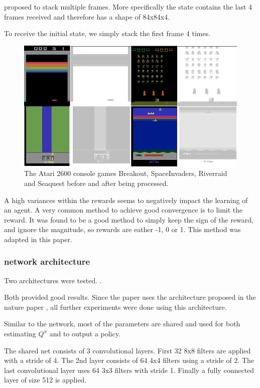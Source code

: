 \citet{nature} proposed to stack multiple frames. More specifically the state contains the last 4 frames received and therefore has a shape of 84x84x4.

To receive the initial state, we simply stack the first frame 4 times.

\begin{figure}
\includegraphics[scale=0.5]{bilder/atarienv.png}
\caption{The Atari 2600 console games Breakout, SpaceInvaders, Riverraid and Seaquest before and after being processed.}
\end{figure}

A high variances within the rewards seems to negatively impact the learning of an agent.
A very common method to achieve good convergence is to limit the reward. 
It was found to be a good method to simply keep the sign of the reward, and ignore the magnitude, so rewards are eather -1, 0 or 1. This method was adapted in this paper.


\subsubsection{network architecture}

Two architectures were tested. \citep{mnih2015atari} \citep{nature}.

Both provided good results. Since the paper uses the architecture proposed in the nature paper \citep{nature}, all further experiments were done using this architecture.

Similar to the \citep{A3C} network, most of the parameters are shared and used for both estimating $Q^\pi$ and to output a policy.

The shared net consists of 3 convolutional layers.
First 32 8x8 filters are applied with a stride of 4.
The 2nd layer consists of 64 4x4 filters using a stride of 2.
The last convolutional layer uses 64 3x3 filters with stride 1.
Finally a fully connected layer of size 512 is applied.


